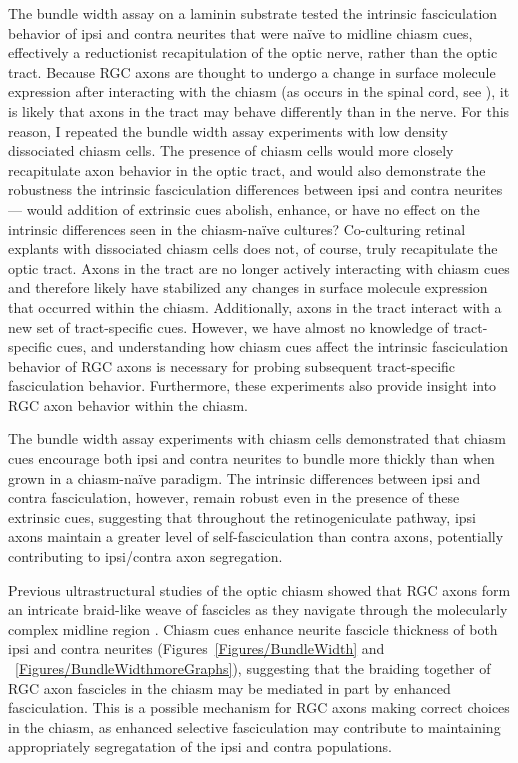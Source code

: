 The bundle width assay on a laminin substrate tested the intrinsic fasciculation behavior of ipsi and contra neurites that were na\"ive to midline chiasm cues, effectively a reductionist recapitulation of the optic nerve, rather than the optic tract.
Because RGC axons are thought to undergo a change in surface molecule expression after interacting with the chiasm (as occurs in the spinal cord, see ), it is likely that axons in the tract may behave differently than in the nerve.
For this reason, I repeated the bundle width assay experiments with low density dissociated chiasm cells.
The presence of chiasm cells would more closely recapitulate axon behavior in the optic tract, and would also demonstrate the robustness the intrinsic fasciculation differences between ipsi and contra neurites --- would addition of extrinsic cues abolish, enhance, or have no effect on the intrinsic differences seen in the chiasm-na\"ive cultures?
Co-culturing retinal explants with dissociated chiasm cells does not, of course, truly recapitulate the optic tract.
Axons in the tract are no longer actively interacting with chiasm cues and therefore likely have stabilized any changes in surface molecule expression that occurred within the chiasm. 
Additionally, axons in the tract interact with a new set of tract-specific cues.
However, we have almost no knowledge of tract-specific cues, and understanding how chiasm cues affect the intrinsic fasciculation behavior of RGC axons is necessary for probing subsequent tract-specific fasciculation behavior.
Furthermore, these experiments also provide insight into RGC axon behavior within the chiasm.

The bundle width assay experiments with chiasm cells demonstrated that chiasm cues encourage both ipsi and contra neurites to bundle more thickly than when grown in a chiasm-na\"ive paradigm.
The intrinsic differences between ipsi and contra fasciculation, however, remain robust even in the presence of these extrinsic cues, suggesting that throughout the retinogeniculate pathway, ipsi axons maintain a greater level of self-fasciculation than contra axons, potentially contributing to ipsi/contra axon segregation.

Previous ultrastructural studies of the optic chiasm showed that RGC axons form an intricate braid-like weave of fascicles as they navigate through the molecularly complex midline region \cite{colello1998changing}.
Chiasm cues enhance neurite fascicle thickness of both ipsi and contra neurites \invitro{} (Figures~\ref{Figures/BundleWidth} and ~\ref{Figures/BundleWidthmoreGraphs}), suggesting that the braiding together of RGC axon fascicles in the chiasm may be mediated in part by enhanced fasciculation.
This is a possible mechanism for RGC axons making correct choices in the chiasm, as enhanced selective fasciculation may contribute to maintaining appropriately segregatation of the ipsi and contra populations.

